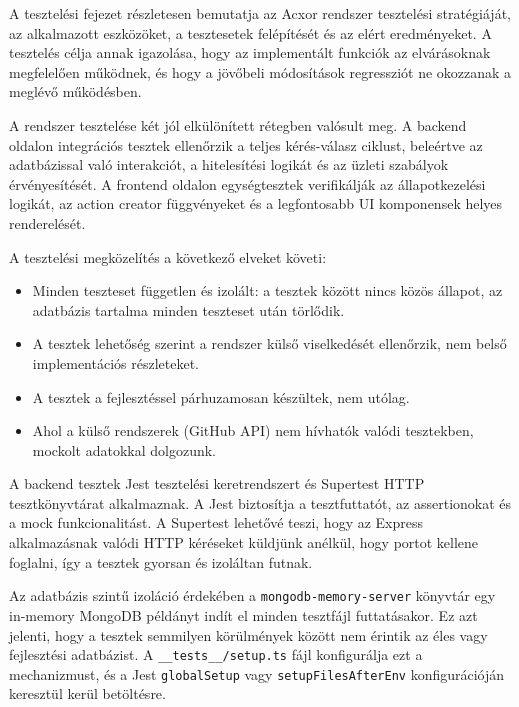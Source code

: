 %

A tesztelési fejezet részletesen bemutatja az Acxor rendszer tesztelési stratégiáját, az alkalmazott eszközöket, a tesztesetek felépítését és az elért eredményeket. A tesztelés célja annak igazolása, hogy az implementált funkciók az elvárásoknak megfelelően működnek, és hogy a jövőbeli módosítások regressziót ne okozzanak a meglévő működésben.

A rendszer tesztelése két jól elkülönített rétegben valósult meg. A backend oldalon integrációs tesztek ellenőrzik a teljes kérés-válasz ciklust, beleértve az adatbázissal való interakciót, a hitelesítési logikát és az üzleti szabályok érvényesítését. A frontend oldalon egységtesztek verifikálják az állapotkezelési logikát, az action creator függvényeket és a legfontosabb UI komponensek helyes renderelését.

A tesztelési megközelítés a következő elveket követi:
\begin{itemize}
  \item Minden teszteset független és izolált: a tesztek között nincs közös állapot, az adatbázis tartalma minden teszteset után törlődik.
  \item A tesztek lehetőség szerint a rendszer külső viselkedését ellenőrzik, nem belső implementációs részleteket.
  \item A tesztek a fejlesztéssel párhuzamosan készültek, nem utólag.
  \item Ahol a külső rendszerek (GitHub API) nem hívhatók valódi tesztekben, mockolt adatokkal dolgozunk.
\end{itemize}





A backend tesztek Jest \cite{jest} tesztelési keretrendszert és Supertest HTTP tesztkönyvtárat alkalmaznak. A Jest biztosítja a tesztfuttatót, az assertionokat és a mock funkcionalitást. A Supertest lehetővé teszi, hogy az Express alkalmazásnak valódi HTTP kéréseket küldjünk anélkül, hogy portot kellene foglalni, így a tesztek gyorsan és izoláltan futnak.

Az adatbázis szintű izoláció érdekében a \texttt{mongodb-memory-server} könyvtár egy in-memory MongoDB példányt indít el minden tesztfájl futtatásakor. Ez azt jelenti, hogy a tesztek semmilyen körülmények között nem érintik az éles vagy fejlesztési adatbázist. A \texttt{\_\_tests\_\_/setup.ts} fájl konfigurálja ezt a mechanizmust, és a Jest \texttt{globalSetup} vagy \texttt{setupFilesAfterEnv} konfigurációján keresztül kerül betöltésre.

